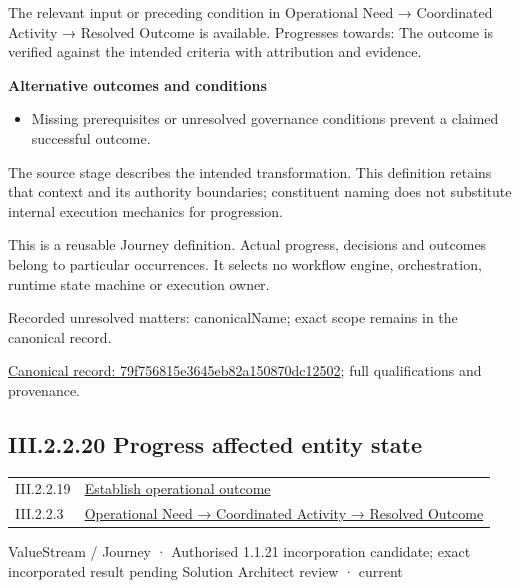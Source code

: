 The relevant input or preceding condition in Operational Need → Coordinated Activity → Resolved Outcome is available. Progresses towards: The outcome is verified against the intended criteria with attribution and evidence.



\par\medskip\textbf{Alternative outcomes and conditions}\par


\begin{itemize}


\item Missing prerequisites or unresolved governance conditions prevent a claimed successful outcome.

\end{itemize}


The source stage describes the intended transformation. This definition retains that context and its authority boundaries; constituent naming does not substitute internal execution mechanics for progression.



This is a reusable Journey definition. Actual progress, decisions and outcomes belong to particular occurrences. It selects no workflow engine, orchestration, runtime state machine or execution owner.


{\small Recorded unresolved matters: canonicalName; exact scope remains in the canonical record.}\par
{\footnotesize \href{../../../../continuum/strategy/value-stream/79f756815e3645eb82a150870dc12502.md}{Canonical record: 79f756815e3645eb82a150870dc12502}; full qualifications and provenance.}\par
\subsection*{III.2.2.20 Progress affected entity state}
\label{navigation:III.2.2.20}

\begin{longtable}{p{.22\linewidth}p{.73\linewidth}}
III.2.2.19 & \hyperref[element:79f756815e3645eb82a150870dc12502]{Establish operational outcome} \\
III.2.2.3 & \hyperref[element:beea615ca7b34bbcbd0ad3a2a6ab2cff]{Operational Need → Coordinated Activity → Resolved Outcome} \\
\end{longtable}
\label{element:57880d06fd0b47d2a19d695afd7d48fc}
{\small ValueStream / Journey · Authorised 1.1.21 incorporation candidate; exact incorporated result pending Solution Architect review · current}\par

